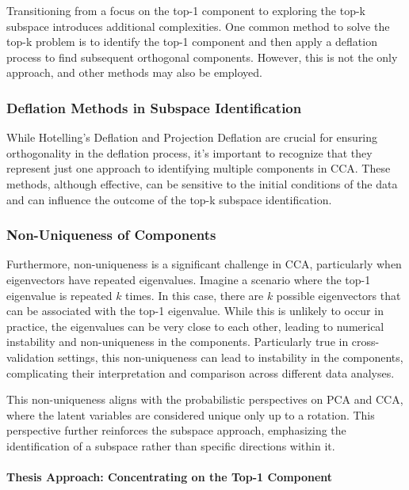 Transitioning from a focus on the top-1 component to exploring the top-k subspace introduces additional complexities. One common method to solve the top-k problem is to identify the top-1 component and then apply a deflation process to find subsequent orthogonal components. However, this is not the only approach, and other methods may also be employed.

\subsubsection{Deflation Methods in Subspace Identification}

While Hotelling's Deflation and Projection Deflation are crucial for ensuring orthogonality in the deflation process, it's important to recognize that they represent just one approach to identifying multiple components in CCA. These methods, although effective, can be sensitive to the initial conditions of the data and can influence the outcome of the top-k subspace identification.

\subsubsection{Non-Uniqueness of Components}

Furthermore, non-uniqueness is a significant challenge in CCA, particularly when eigenvectors have repeated eigenvalues. Imagine a scenario where the top-1 eigenvalue is repeated \(k\) times. In this case, there are \(k\) possible eigenvectors that can be associated with the top-1 eigenvalue. While this is unlikely to occur in practice, the eigenvalues can be very close to each other, leading to numerical instability and non-uniqueness in the components. Particularly true in cross-validation settings, this non-uniqueness can lead to instability in the components, complicating their interpretation and comparison across different data analyses.

This non-uniqueness aligns with the probabilistic perspectives on PCA and CCA, where the latent variables are considered unique only up to a rotation. This perspective further reinforces the subspace approach, emphasizing the identification of a subspace rather than specific directions within it.

\paragraph{Thesis Approach: Concentrating on the Top-1 Component}

